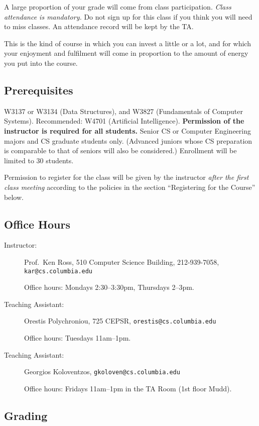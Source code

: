 A large proportion of your grade will come from class participation.
{\em Class attendance is mandatory.}  Do not sign up for this class if
you think you will need to miss classes.  An attendance record will be
kept by the TA.

This is the kind of course in which you can invest a little or a lot,
and for which your enjoyment and fulfilment will come in proportion
to the amount of energy you put into the course.

\subsection*{Prerequisites}
W3137 or W3134 (Data Structures),
and W3827 
(Fundamentals of Computer Systems).  
Recommended: W4701 (Artificial Intelligence).
{\bf Permission of the instructor is required for all students.}
Senior
CS or Computer Engineering majors and CS graduate students only.
(Advanced juniors whose CS preparation is comparable to that
of seniors will also be considered.)
Enrollment will be limited to 30 students.

Permission to register for the class will be given by the instructor
{\em after the first class meeting}
according to the policies in the section ``Registering for the Course''
below.

\subsection*{Office Hours}
\begin{description}
\item[Instructor:] Prof.\ Ken Ross, 510 Computer Science Building,
212-939-7058, {\tt kar@cs.columbia.edu}

Office hours: Mondays 2:30--3:30pm, Thursdays 2--3pm.

\item[Teaching Assistant:] Orestis Polychroniou, 725 CEPSR, {\tt orestis@cs.columbia.edu}

Office hours: Tuesdays 11am--1pm.

\item[Teaching Assistant:] Georgios Koloventzos, {\tt gkoloven@cs.columbia.edu}

Office hours: Fridays 11am--1pm in the TA Room (1st floor Mudd).

\end{description}

\subsection*{Grading}

